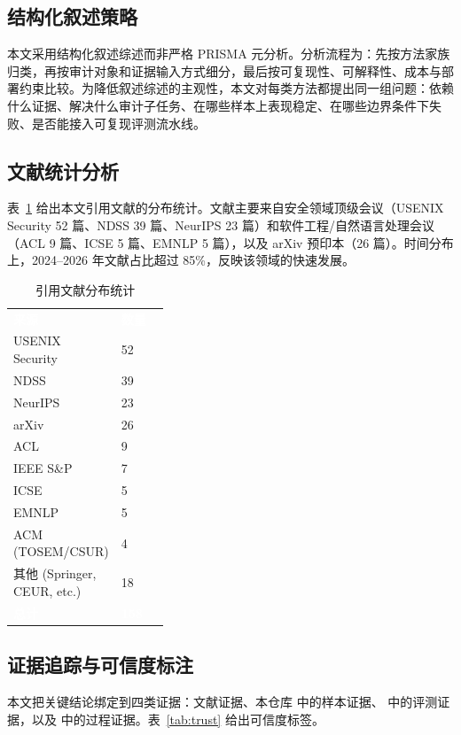 \documentclass[11pt,a4paper,onecolumn]{article}
\newcommand{\tabheader}[1]{\textcolor{white}{\textbf{#1}}}
\begin{document}
\subsection{结构化叙述策略}
本文采用结构化叙述综述而非严格 PRISMA 元分析。分析流程为：先按方法家族归类，再按审计对象和证据输入方式细分，最后按可复现性、可解释性、成本与部署约束比较。为降低叙述综述的主观性，本文对每类方法都提出同一组问题：依赖什么证据、解决什么审计子任务、在哪些样本上表现稳定、在哪些边界条件下失败、是否能接入可复现评测流水线。

\subsection{文献统计分析}
表~\ref{tab:literature_stats} 给出本文引用文献的分布统计。文献主要来自安全领域顶级会议（USENIX Security 52 篇、NDSS 39 篇、NeurIPS 23 篇）和软件工程/自然语言处理会议（ACL 9 篇、ICSE 5 篇、EMNLP 5 篇），以及 arXiv 预印本（26 篇）。时间分布上，2024--2026 年文献占比超过 85\%，反映该领域的快速发展。

\begin{table}[htbp]
\caption{引用文献分布统计}
\label{tab:literature_stats}
\centering
\small
\begin{tabularx}{\linewidth}{@{} p{0.35\linewidth}X @{}}
\rowcolor{tabhead}
\tabheader{来源} & \tabheader{数量} \\
\rowcolor{tabalt} USENIX Security & 52 \\
NDSS & 39 \\
\rowcolor{tabalt} NeurIPS & 23 \\
arXiv & 26 \\
\rowcolor{tabalt} ACL & 9 \\
IEEE S\&P & 7 \\
\rowcolor{tabalt} ICSE & 5 \\
\rowcolor{tabalt} EMNLP & 5 \\
ACM (TOSEM/CSUR) & 4 \\
\rowcolor{tabalt} 其他 (Springer, CEUR, etc.) & 18 \\
\hline
\rowcolor{tabhead} \tabheader{总计} & \tabheader{158} \\
\end{tabularx}
\end{table}

\subsection{证据追踪与可信度标注}
本文把关键结论绑定到四类证据：文献证据、本仓库  中的样本证据、 中的评测证据，以及  中的过程证据。表~\ref{tab:trust} 给出可信度标签。
\end{document}
